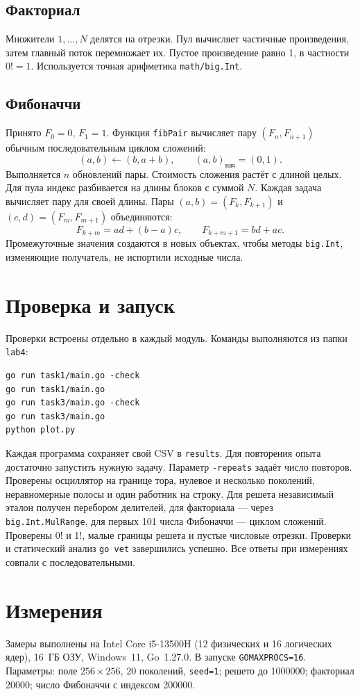 \documentclass[a4paper,14pt]{extarticle}
\begin{document}
\subsection{Факториал}
Множители $1,\ldots,N$ делятся на отрезки. Пул вычисляет частичные
произведения, затем главный поток перемножает их.
Пустое произведение равно 1, в частности $0!=1$.
Используется точная арифметика \texttt{math/big.Int}.

\subsection{Фибоначчи}
Принято $F_0=0$, $F_1=1$. Функция \texttt{fibPair} вычисляет пару
$(F_n,F_{n+1})$ обычным последовательным циклом сложений:
\[
(a,b)\leftarrow(b,a+b), \qquad (a,b)_{\text{нач}}=(0,1).
\]
Выполняется $n$ обновлений пары. Стоимость сложения растёт с длиной целых.
Для пула индекс разбивается на длины блоков с суммой $N$.
Каждая задача вычисляет пару для своей длины.
Пары $(a,b)=(F_k,F_{k+1})$ и $(c,d)=(F_m,F_{m+1})$ объединяются:
\[
F_{k+m}=ad+(b-a)c,\qquad F_{k+m+1}=bd+ac.
\]
Промежуточные значения создаются в новых объектах, чтобы методы
\texttt{big.Int}, изменяющие получатель, не испортили исходные числа.

\section{Проверка и запуск}
Проверки встроены отдельно в каждый модуль.
Команды выполняются из папки \texttt{lab4}:
\begin{lstlisting}
go run task1/main.go -check
go run task1/main.go
go run task3/main.go -check
go run task3/main.go
python plot.py
\end{lstlisting}
Каждая программа сохраняет свой CSV в \texttt{results}.
Для повторения опыта достаточно запустить нужную задачу.
Параметр \texttt{-repeats} задаёт число повторов.
Проверены осциллятор на границе тора, нулевое и несколько поколений,
неравномерные полосы и один работник на строку.
Для решета независимый эталон получен перебором делителей,
для факториала --- через \texttt{big.Int.MulRange},
для первых 101 числа Фибоначчи --- циклом сложений.
Проверены 0! и 1!, малые границы решета и пустые числовые отрезки.
Проверки и статический анализ \texttt{go vet} завершились успешно.
Все ответы при измерениях совпали с последовательными.

\section{Измерения}
Замеры выполнены на Intel Core i5-13500H (12 физических и 16 логических
ядер), 16~ГБ ОЗУ, Windows~11, Go~1.27.0.
В запуске \texttt{GOMAXPROCS=16}.
Параметры: поле $256\times256$, 20 поколений, \texttt{seed=1};
решето до 1000000; факториал 20000; число Фибоначчи с индексом 200000.
\end{document}
